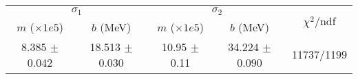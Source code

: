 \begin{tabular}{cc|cc||c}
\multicolumn{2}{c|}{$\sigma_1$} & \multicolumn{2}{|c}{$\sigma_2$} & \multirow{2}{*}{$\chi^2/$ndf} \\
$m$ ($\times1e5$) & $b$ (MeV) & $m$ ($\times1e5$) & $b$ (MeV) & \\
\hline
8.385 $\pm$ 0.042 & 18.513 $\pm$ 0.030 & 10.95 $\pm$ 0.11 & 34.224 $\pm$ 0.090 & 11737/1199\\
\end{tabular}
